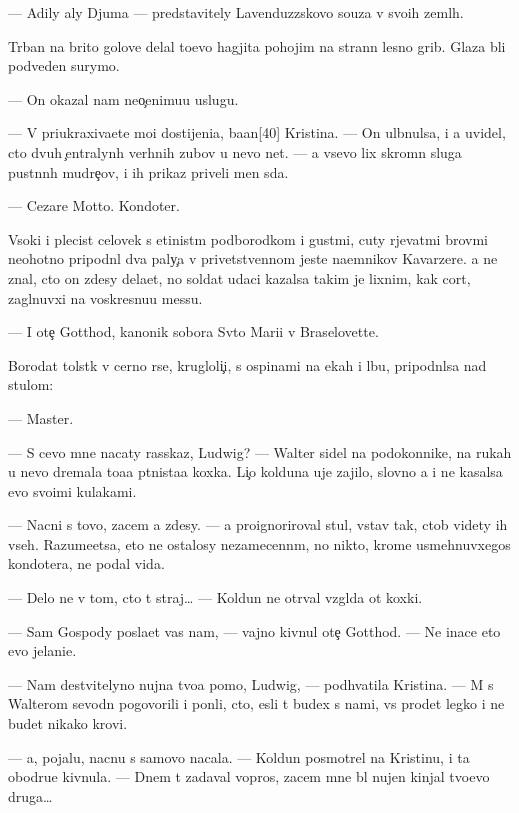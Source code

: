 \documentclass[10pt]{book}
\begin{document}
— Adily aly Djuma — predstavitely Lavenduzzskovo so{\y}uza v svo{\y}ih zeml{\ia}h.

T{\iu}rban na brito{\y} golove delal to{\x}evo hagjita pohojim na strann{\yi}{\y} lesno{\y} grib. Glaza b{\yi}li podveden{\yi} surymo{\y}.

— On okazal nam neo{\c}enimu{\y}u uslugu.

— V{\yi} priukraxiva{\y}ete mo{\y}i dostijeni{\y}a, ba{\y}an[40] Kristina. — On ul{\yi}bnulsa, i {\y}a uvidel, cto dvuh {\c}entralyn{\yi}h verhnih zubov u nevo net. — {\Y}a vsevo lix skromn{\yi}{\y} sluga pust{\yi}nn{\yi}h mudre{\c}ov, i ih prikaz{\yi} priveli men{\ia} s{\iu}da.

— Cezare Motto. Kondot{\y}er.

V{\yi}soki{\y} i plecist{\yi}{\y} celovek s {\x}etinist{\yi}m podborodkom i gust{\yi}mi, cuty r{\yi}jevat{\yi}mi brov{\ia}mi neohotno pripodn{\ia}l dva paly{\c}a v privetstvennom jeste na{\y}emnikov Kavarzere. {\Y}a ne znal, cto on zdesy dela{\y}et, no soldat udaci kazalsa takim je lixnim, kak cort, zagl{\ia}nuvxi{\y} na voskresnu{\y}u messu.

— I ote{\c} Gotthod, kanonik sobora Sv{\ia}to{\y} Mari{\y}i v Braselovette.

Borodat{\yi}{\y} tolst{\ia}k v cerno{\y} r{\ia}se, krugloli{\c}i{\y}, s ospinami na {\x}ekah i lbu, pripodn{\ia}lsa nad stulom:

— Master.

— S cevo mne nacaty rasskaz, Ludwig? — Walter sidel na podokonnike, na rukah u nevo dremala to{\x}a{\y}a p{\ia}tnista{\y}a koxka. Li{\c}o kolduna uje zajilo, slovno {\y}a i ne kasalsa {\y}evo svo{\y}imi kulakami.

— Nacni s tovo, zacem {\y}a zdesy. — {\Y}a proignoriroval stul, vstav tak, ctob{\yi} videty ih vseh. Razume{\y}etsa, eto ne ostalosy nezamecenn{\yi}m, no nikto, krome usmehnuvxegos{\ia} kondot{\y}era, ne podal vida.

— Delo ne v tom, cto t{\yi} straj… — Koldun ne otr{\yi}val vzgl{\ia}da ot koxki.

— Sam Gospody pos{\yi}la{\y}et vas nam, — vajno kivnul ote{\c} Gotthod. — Ne inace eto {\y}evo jelani{\y}e.

— Nam de{\y}stvitelyno nujna tvo{\y}a pomo{\x}, Ludwig, — podhvatila Kristina. — M{\yi} s Walterom sevodn{\ia} pogovorili i pon{\ia}li, cto, {\y}esli t{\yi} budex s nami, vs{\e} pro{\y}det legko i ne budet nikako{\y} krovi.

— {\Y}a, pojalu{\y}, nacnu s samovo nacala. — Koldun posmotrel na Kristinu, i ta obodr{\ia}{\y}u{\x}e kivnula. — Dnem t{\yi} zadaval vopros, zacem mne b{\yi}l nujen kinjal tvo{\y}evo druga…
\end{document}
